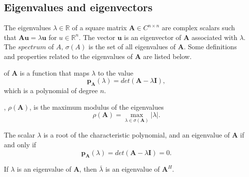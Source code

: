 \documentclass[12pt]{report}
\begin{document}
\subsection{Eigenvalues and eigenvectors}
The eigenvalues $\lambda \in \mathbb{R}$ of a square matrix $\mathbf{A} \in C^{n\times n}$ are complex scalars such that 
$\mathbf{A}\mathbf{u}=\lambda \mathbf{u}$ for $u \in \mathbb{R}^n$. The vector $\mathbf{u}$ is an eigenvector of $\mathbf{A}$ associated with $\lambda$. The $spectrum$ of
$A$, $\sigma(A)$ is the set of all eigenvalues of $\mathbf{A}$.
Some definitions and properties related to the eigenvalues of $\mathbf{A}$ are listed below.
\begin{description}
\item[The characteristic polynomial] of $\mathbf{A}$ is a function that maps $\lambda$ to the value $$\mathbf{p}_\mathbf{A}(\lambda )=det(\mathbf{A}-\lambda \mathbf{I}),$$ which is a polynomial
of degree $n$. 
\item[The spectral radius], $\rho (\mathbf{A})$, is the maximum modulus of the eigenvalues 
$$\rho(\mathbf{A})=\max_{\lambda\in \sigma(\mathbf{A})}|\lambda|.$$
\item The scalar $\lambda$ is a root of the characteristic polynomial, and an eigenvalue of $\mathbf{A}$ if and only if $$\mathbf{p}_\mathbf{A}(\lambda )=det(\mathbf{A}-\lambda \mathbf{I})=0.$$
\item If $\lambda$ is an eigenvalue of $\mathbf{A}$, then $\bar{\lambda}$ is an eigenvalue of $\mathbf{A}^H$.
\end{description}
\end{document}
